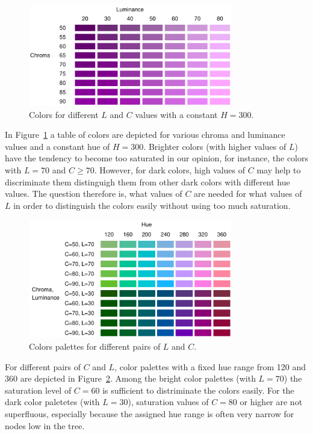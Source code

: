 \documentclass[journal]{vgtc}                %
\begin{document}
\begin{figure}[htb]
  \centering
  \includegraphics[width=3.5in]{LC.pdf}
  \caption{Colors for different $L$ and $C$ values with a constant $H=300$.}\label{fig:lc}
\end{figure}

In Figure~\ref{fig:lc} a table of colors are depicted for various chroma and luminance values and a constant hue of $H=300$. Brighter colors (with higher values of $L$) have the tendency to become too saturated in our opinion, for instance, the colors with $L=70$ and $C\geq70$. However, for dark colors, high values of $C$ may help to discriminate them distinguigh them from other dark colors with different hue values. The question therefore is, what values of $C$ are needed for what values of $L$ in order to distinguish the colors easily without using too much saturation.


\begin{figure}[htb]
  \centering
  \includegraphics[width=3.5in]{LC2.pdf}
  \caption{Colors palettes for different pairs of $L$ and $C$.}\label{fig:lc2}
\end{figure}

For different pairs of $C$ and $L$, color palettes with a fixed hue range from 120 and 360 are depicted in Figure~\ref{fig:lc2}. Among the bright color palettes (with $L=70$) the saturation level of $C=60$ is sufficient to distriminate the colors easily. For the dark color paletetes (with $L=30$), saturation values of $C=80$ or higher are not superfluous, especially because the assigned hue range is often very narrow for nodes low in the tree.
\end{document}

